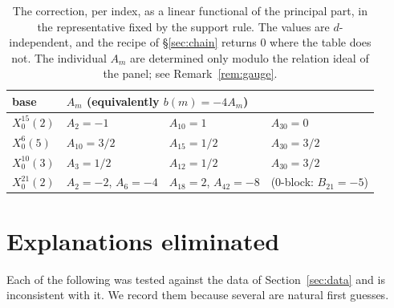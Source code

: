 \documentclass[11pt,reqno]{amsart}
\theoremstyle{plain}
\theoremstyle{definition}
\begin{document}
\begin{table}[ht]
\centering
\begin{tabular}{llll}
\toprule
base & \multicolumn{3}{l}{$A_m$ (equivalently $b(m)=-4A_m$)}\\
\midrule
$X_0^{15}(2)$ & $A_2=-1$   & $A_{10}=1$   & $A_{30}=0$\\
$X_0^{6}(5)$  & $A_{10}=3/2$ & $A_{15}=1/2$ & $A_{30}=3/2$\\
$X_0^{10}(3)$ & $A_3=1/2$  & $A_{12}=1/2$ & $A_{30}=3/2$\\
$X_0^{21}(2)$ & $A_2=-2$, $A_6=-4$ & $A_{18}=2$, $A_{42}=-8$ & ($0$-block: $B_{21}=-5$)\\
\bottomrule
\end{tabular}
\medskip
\caption{The correction, per index, as a linear functional of the principal part, in the
representative fixed by the support rule. The values are $d$-independent, and the recipe of
\S\ref{sec:chain} returns $0$ where the table does not. The individual $A_m$ are determined
only modulo the relation ideal of the panel; see Remark~\ref{rem:gauge}.}
\label{tab:A}
\end{table}

\section{Explanations eliminated}\label{sec:elim}

Each of the following was tested against the data of Section~\ref{sec:data} and is inconsistent
with it. We record them because several are natural first guesses.
\end{document}
